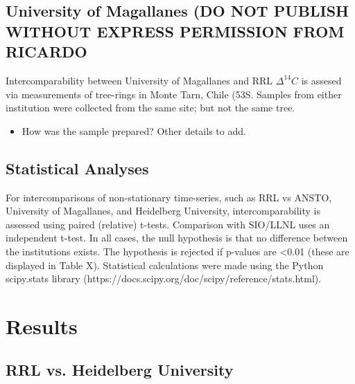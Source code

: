 \documentclass{BrJG_submit}
\begin{document}
\subsection{University of Magallanes (DO NOT PUBLISH WITHOUT EXPRESS PERMISSION FROM RICARDO}
  
Intercomparability between University of Magallanes and RRL ${\Delta^{14}C}$ is assesed via measurements of tree-rings in Monte Tarn, Chile (53S. Samples from either institution were collected from the same site; but not the same tree. 
\begin{itemize}
	\item How was the sample prepared? Other details to add. 
\end{itemize}


\subsection{Statistical Analyses}
For intercomparisons of non-stationary time-series, such as RRL vs ANSTO, University of Magallanes, and Heidelberg University, intercomparability is assessed using paired (relative) t-tests. Comparison with SIO/LLNL uses an independent t-test. In all cases, the null hypothesis is that no difference between the institutions exists. The hypothesis is rejected if p-values are <0.01 (these are displayed in Table X). Statistical calculations were made using the Python scipy.stats library (https://docs.scipy.org/doc/scipy/reference/stats.html).



%
%
%
%
\newpage
\section{Results}

\subsection{RRL vs. Heidelberg University}
\end{document}
